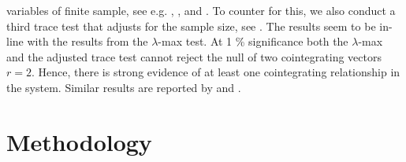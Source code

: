 \documentclass[10pt]{article}
\numberwithin{equation}{section}
\numberwithin{table}{section}
\numberwithin{figure}{section}
\begin{document}
\begin{spacing}{1.5}
variables of finite sample, see e.g. \cite{cheung1993finite}, \cite{gonzalo2000robustness}, \cite{silvapulle2000effect} and \cite{hubrich2001review}. To counter for this, we also conduct a third trace test that adjusts for the sample size, see \cite{johansen2002small}. The results seem to be in-line with the results from the $\lambda$-max test. At 1 \% significance both the $\lambda$-max and the adjusted trace test cannot reject the null of two cointegrating vectors $r=2$. Hence, there is strong evidence of at least one cointegrating relationship in the system. Similar results are reported by \cite{bjornland2006importance} and \cite{papadamou2012monetary}.       
 
\section{Methodology}
\label{sec:meth}
 

\end{spacing}
\end{document}
